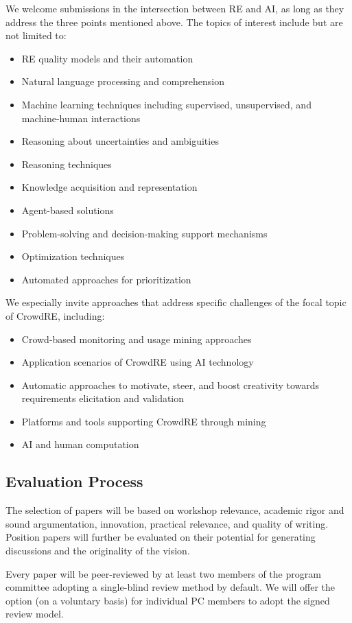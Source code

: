 \documentclass[conference,9pt]{IEEEtran}
\begin{document}
We welcome submissions in the intersection between RE and AI, as long as they address the three points mentioned above. The topics of interest include but are not limited to:

\begin{itemize}
\item RE quality models and their automation
\item Natural language processing and comprehension
\item Machine learning techniques including supervised, unsupervised, and machine-human interactions
\item Reasoning about uncertainties and ambiguities
\item Reasoning techniques
\item Knowledge acquisition and representation
\item Agent-based solutions
\item Problem-solving and decision-making support mechanisms
\item Optimization techniques
\item Automated approaches for prioritization
\end{itemize}

We especially invite approaches that address specific challenges of the focal topic of CrowdRE, including:
\begin{itemize}
\item Crowd-based monitoring and usage mining approaches
\item Application scenarios of CrowdRE using AI technology
\item Automatic approaches to motivate, steer, and boost creativity towards requirements elicitation and validation
\item Platforms and tools supporting CrowdRE through mining
\item AI and human computation
\end{itemize}

\subsection{Evaluation Process}
The selection of papers will be based on workshop relevance, academic rigor and sound argumentation, innovation, practical relevance, and quality of writing. Position papers will further be evaluated on their potential for generating discussions and the originality of the vision.

Every paper will be peer-reviewed by at least two members of the program committee adopting a single-blind review method by default. We will offer the option (on a voluntary basis) for individual PC members to adopt the signed review model.
\end{document}
